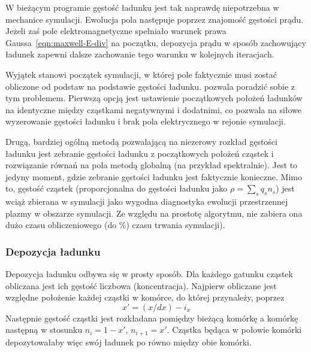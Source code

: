 W bieżącym programie gęstość ładunku jest tak naprawdę niepotrzebna w
mechanice symulacji. Ewolucja pola następuje poprzez znajomość gęstości prądu.
Jeżeli zaś pole elektromagnetyczne spełniało warunek
prawa Gaussa~\ref{eqn:maxwell-E-div} na początku, depozycja prądu w sposób
zachowujący ładunek zapewni dalsze zachowanie tego warunku w kolejnych
iteracjach.~\cite{bunemanvillasenor}

Wyjątek stanowi początek symulacji, w której pole faktycznie musi zostać
obliczone od podstaw na podstawie gęstości ładunku. \pythonpic{} pozwala
poradzić sobie z tym problemem. Pierwszą opcją jest ustawienie początkowych
położeń ładunków na identyczne między cząstkami negatywnymi i dodatnimi, co
pozwala na siłowe wyzerowanie gęstości ładunku i brak pola elektrycznego w
rejonie symulacji.

Drugą, bardziej ogólną metodą pozwalającą na niezerowy rozkład gęstości
ładunku jest zebranie gęstości ładunku z początkowych położeń cząstek i
rozwiązanie równań na pola metodą globalną (na przykład spektralnie). Jest
to jedyny moment, gdzie zebranie gęstości ładunku jest faktycznie konieczne.
Mimo to, gęstość cząstek (proporcjonalna do gęstości ładunku jako $\rho =
\sum_s q_s n_s$) jest wciąż zbierana w symulacji jako wygodna diagnostyka
ewolucji przestrzennej plazmy w obszarze symulacji. Ze względu na prostotę
algorytmu, nie zabiera ona dużo czasu obliczeniowego (do
\%) czasu trwania symulacji).

\subsubsection{Depozycja ładunku}

 Depozycja ładunku odbywa się w prosty sposób. Dla każdego gatunku
cząstek obliczana jest ich gęstość liczbowa (koncentracja). Najpierw
obliczane jest względne położenie każdej cząstki w komórce, do której
przynależy, poprzez
\begin{equation}
x' = (x/dx) - i_x
\label{eqn:relative-position}
\end{equation}
Następnie gęstość cząstki jest rozkładana pomiędzy bieżącą komórkę a
komórkę następną w stosunku $n_i = 1-x'$, $n_{i+1} = x'$. Cząstka będąca
w połowie komórki depozytowałaby więc swój ładunek po równo między obie
komórki.


